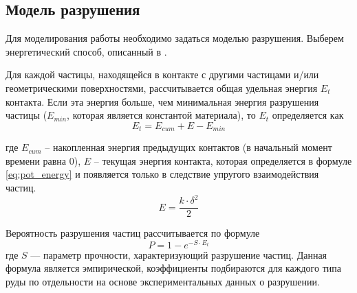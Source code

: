 \documentclass[utf8x, 14pt, oneside, a4paper]{article}
\begin{document}
\subsection{Модель разрушения}
\label{sub:break_model}
Для моделирования работы необходимо задаться моделью разрушения.
Выберем энергетический способ, описанный в \cite{razr}.

Для каждой частицы, находящейся в контакте с другими частицами и/или геометрическими поверхностями, рассчитывается общая удельная энергия $E_t$ контакта.
Если эта энергия больше, чем минимальная энергия разрушения частицы ($E_{min}$, которая является константой материала), то $E_{t}$ определяется как
\begin{equation}
\label{eq:break_Et}
E_t = E_{cum} + E - E_{min}
\end{equation}

где $E_{cum}$ -- накопленная энергия предыдущих контактов (в начальный момент времени равна 0), $E$ -- текущая энергия контакта, которая определяется в формуле \ref{eq:pot_energy} и появляется только в следствие упругого взаимодействия частиц.
\begin{equation}
\label{eq:break_E}
E = \frac{k \cdot \delta^2}{2}
\end{equation}

Вероятность разрушения частиц рассчитывается по формуле
\begin{equation}
\label{eq:break_P}
P = 1 - e^{-S \cdot E_t} 
\end{equation}
где $S$ — параметр прочности, характеризующий разрушение частиц. Данная формула является эмпирической, коэффициенты подбираются для каждого типа руды по отдельности на основе экспериментальных данных о разрушении.
\end{document}
